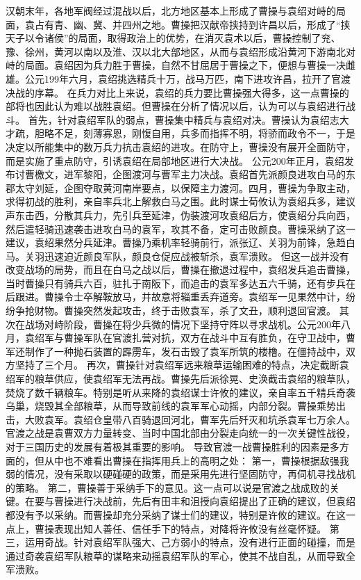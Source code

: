 \documentclass[a4paper,12pt,UTF8,twoside]{ctexbook}
\begin{document}
汉朝末年，各地军阀经过混战以后，北方地区基本上形成了曹操与袁绍对峙的局面，袁占有青、幽、冀、并四州之地。曹操把汉献帝挟持到许昌以后，形成了“挟天子以令诸侯”的局面，取得政治上的优势，在消灭袁术以后，曹操控制了兖、豫、徐州，黄河以南以及淮、汉以北大部地区，从而与袁绍形成沿黄河下游南北对峙的局面。袁绍因为兵力胜于曹操，自然不甘屈居于曹操之下，便想与曹操一决雌雄。公元199年六月，袁绍挑选精兵十万，战马万匹，南下进攻许昌，拉开了官渡决战的序幕。
在兵力对比上来说，袁绍的兵力要比曹操强大得多，这一点曹操的部将也因此认为难以战胜袁绍。但曹操在分析了情况以后，认为可以与袁绍进行战斗。
首先，针对袁绍军队的弱点，曹操集中精兵与袁绍对决。曹操认为袁绍志大才疏，胆略不足，刻薄寡恩，刚愎自用，兵多而指挥不明，将骄而政令不一，于是决定以所能集中的数万兵力抗击袁绍的进攻。在防守上，曹操没有展开全面防守，而是实施了重点防守，引诱袁绍在局部地区进行大决战。
公元200年正月，袁绍发布讨曹檄文，进军黎阳，企图渡河与曹军主力决战。袁绍首先派颜良进攻白马的东郡太守刘延，企图夺取黄河南岸要点，以保障主力渡河。四月，曹操为争取主动，求得初战的胜利，亲自率兵北上解救白马之围。此时谋士荀攸认为袁绍兵多，建议声东击西，分散其兵力，先引兵至延津，伪装渡河攻袁绍后方，使袁绍分兵向西，然后遣轻骑迅速袭击进攻白马的袁军，攻其不备，定可击败颜良。曹操采纳了这一建议，袁绍果然分兵延津。曹操乃乘机率轻骑前行，派张辽、关羽为前锋，急趋白马。关羽迅速迫近颜良军队，颜良仓促应战被斩杀，袁军溃败。
但这一战并没有改变战场的局势，而且在白马之战以后，曹操在撤退过程中，袁绍发兵追击曹操，当时曹操只有骑兵六百，驻扎于南阪下，而追击的袁军多达五六千骑，还有步兵在后跟进。曹操令士卒解鞍放马，并故意将辎重丢弃道旁。袁绍军一见果然中计，纷纷争抢财物。曹操突然发起攻击，终于击败袁军，杀了文丑，顺利退回官渡。
其次在战场对峙阶段，曹操在将少兵微的情况下坚持守阵以寻求战机。公元200年八月，袁绍军与曹操军队在官渡扎营对抗，双方在战斗中互有胜负，在守卫战中，曹军还制作了一种抛石装置的霹雳车，发石击毁了袁军所筑的楼橹。在僵持战中，双方坚持了三个月。
再次，曹操针对袁绍军远来粮草运输困难的特点，决定截断袁绍军的粮草供应，使袁绍军无法再战。曹操先后派徐晃、史涣截击袁绍的粮草队，焚烧了数千辆粮车。特别是听从来降的袁绍谋士许攸的建议，亲自率五千精兵奇袭乌巢，烧毁其全部粮草，从而导致前线的袁军军心动摇，内部分裂。曹操乘势出击，大败袁军。袁绍仓皇带八百骑退回河北，曹军先后歼灭和坑杀袁军七万余人。
官渡之战是袁曹双方力量转变、当时中国北部由分裂走向统一的一次关键性战役，对于三国历史的发展有着极其重要的影响。
导致官渡一战曹操胜利的因素是多方面的，但从中也不难看出曹操在指挥用兵上的高明之处：
第一，曹操根据敌强我弱的情况，没有采取以硬碰硬的政策，而是采用先进行坚固防守，再伺机寻找战机的策略。
第二，曹操善于采纳手下的意见。这一点可以说是官渡之战成败的关键。在要与曹操进行决战前，先后有田丰和沮授向袁绍提出了正确的建议，但袁绍都没有予以采纳。而曹操却充分采纳了谋士们的建议，特别是许攸的建议。在这一点上，曹操表现出知人善任、信任手下的特点，对降将许攸没有丝毫怀疑。
第三，运用奇战。针对袁绍军队强大、己方弱小的特点，没有进行正面的碰撞，而是通过奇袭袁绍军队粮草的谋略来动摇袁绍军队的军心，使其不战自乱，从而导致全军溃败。
\end{document}

